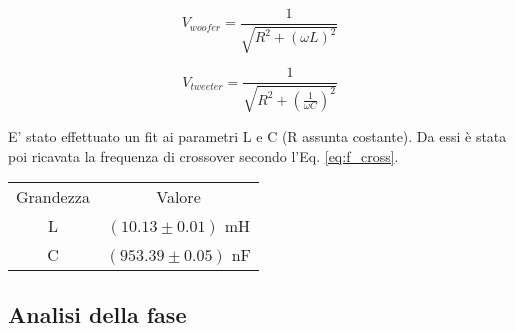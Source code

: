 \documentclass[../Relazione_circuiti]{subfiles}
\begin{document}
\begin{equation}
V_{woofer} = \frac{1}{\sqrt{R^2+(\omega L)^2}}
\end{equation}

\begin{equation}
V_{tweeter} = \frac{1}{\sqrt{R^2+(\frac{1}{\omega C})^2}}
\end{equation}



E' stato effettuato un fit ai parametri L e C (R assunta costante). Da essi è stata poi ricavata la frequenza di crossover secondo l'Eq. \ref{eq:f_cross}. 

\begin{tabular}{c | c }

Grandezza & Valore \\

L & $(10.13 \pm 0.01)$ mH \\
C & $(953.39 \pm 0.05)$ nF

\end{tabular}

\subsection{Analisi della fase}
\end{document}
